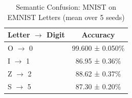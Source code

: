 
\begin{table}[h]
\centering
\caption{Semantic Confusion: MNIST on EMNIST Letters (mean over 5 seeds)}
\label{tab:extension2_emnist_letters}
\begin{tabular}{lc}
\toprule
\textbf{Letter $\rightarrow$ Digit} & \textbf{Accuracy} \\
\midrule
O $\rightarrow$ 0 & 99.600 ± 0.050\% \\
I $\rightarrow$ 1 & 86.95 ± 0.36\% \\
Z $\rightarrow$ 2 & 88.62 ± 0.37\% \\
S $\rightarrow$ 5 & 87.30 ± 0.20\% \\
\bottomrule
\end{tabular}
\end{table}
